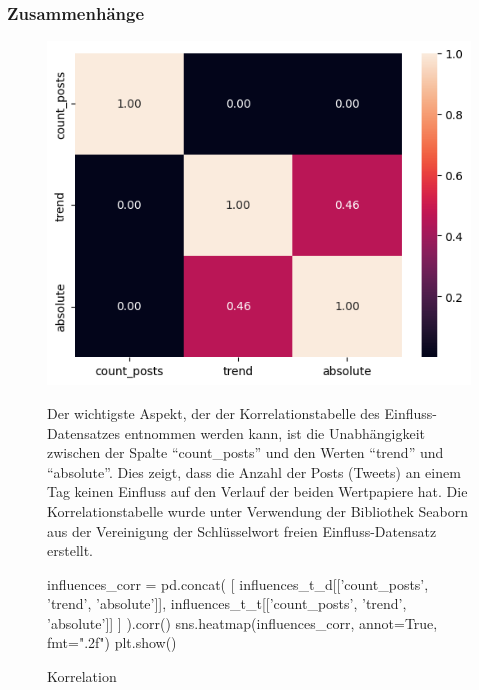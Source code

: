 \documentclass{article}
\begin{document}
\subsubsection{Zusammenhänge}
\begin{figure}[!htb]
	\begin{minipage}{0.4\textwidth}
    		\includegraphics[width=\textwidth]{./imgs/Korrelation.png}
    		\caption{Korrelation}
    		\label{fig:Korrelation}
  	\end{minipage}
  	\hfill
	\begin{minipage}{0.55\textwidth}
		Der wichtigste Aspekt, der der Korrelationstabelle des Einfluss-Datensatzes entnommen werden kann, ist die Unabhängigkeit zwischen der Spalte ``count\_posts'' und den Werten ``trend'' und ``absolute''.
		Dies zeigt, dass die Anzahl der Posts (Tweets) an einem Tag keinen Einfluss auf den Verlauf der beiden Wertpapiere hat.
		Die Korrelationstabelle wurde unter Verwendung der Bibliothek Seaborn aus der Vereinigung der Schlüsselwort freien Einfluss-Datensatz erstellt.
	\begin{python}
	influences_corr = pd.concat(
	    [
	        influences_t_d[['count_posts', 'trend', 'absolute']],
	        influences_t_t[['count_posts', 'trend', 'absolute']]
	    ]
	).corr()
	sns.heatmap(influences_corr, annot=True, fmt=".2f")
	plt.show()
	\end{python}
		
	\end{minipage}
\end{figure}
\end{document}
